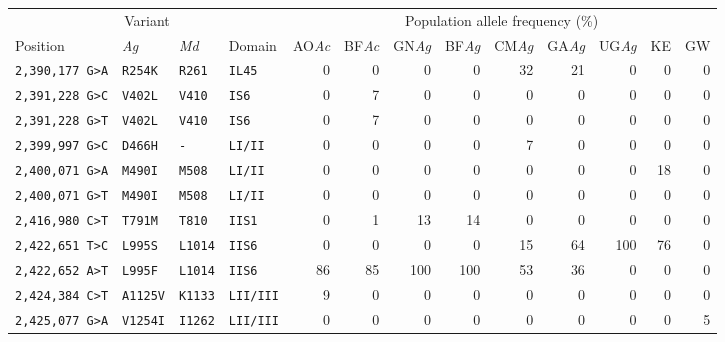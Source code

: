 
\begin{tabular}{llllrrrrrrrrr}
\toprule
\multicolumn{4}{c}{Variant} &
\multicolumn{9}{c}{Population allele frequency (\%)}\\
\cmidrule(r){1-4}
\cmidrule(r){5-13}
Position\tnote{1} & 
\emph{Ag}\tnote{2} & 
\emph{Md}\tnote{3} &
Domain\tnote{4} &
AO\emph{Ac} & 
BF\emph{Ac} & 
GN\emph{Ag} & 
BF\emph{Ag} & 
CM\emph{Ag} & 
GA\emph{Ag} & 
UG\emph{Ag} & 
KE & 
GW\\
\midrule

\texttt{2,390,177 G>A} & \texttt{R254K} & \texttt{R261} & \texttt{IL45} & 0 & 0 & 0 & 0 & 32 & 21 & 0 & 0 & 0 \\

\texttt{2,391,228 G>C} & \texttt{V402L} & \texttt{V410} & \texttt{IS6} & 0 & 7 & 0 & 0 & 0 & 0 & 0 & 0 & 0 \\

\texttt{2,391,228 G>T} & \texttt{V402L} & \texttt{V410} & \texttt{IS6} & 0 & 7 & 0 & 0 & 0 & 0 & 0 & 0 & 0 \\

\texttt{2,399,997 G>C} & \texttt{D466H} & \texttt{-} & \texttt{LI/II} & 0 & 0 & 0 & 0 & 7 & 0 & 0 & 0 & 0 \\

\texttt{2,400,071 G>A} & \texttt{M490I} & \texttt{M508} & \texttt{LI/II} & 0 & 0 & 0 & 0 & 0 & 0 & 0 & 18 & 0 \\

\texttt{2,400,071 G>T} & \texttt{M490I} & \texttt{M508} & \texttt{LI/II} & 0 & 0 & 0 & 0 & 0 & 0 & 0 & 0 & 0 \\

\texttt{2,416,980 C>T} & \texttt{T791M} & \texttt{T810} & \texttt{IIS1} & 0 & 1 & 13 & 14 & 0 & 0 & 0 & 0 & 0 \\

\texttt{2,422,651 T>C} & \texttt{L995S} & \texttt{L1014} & \texttt{IIS6} & 0 & 0 & 0 & 0 & 15 & 64 & 100 & 76 & 0 \\

\texttt{2,422,652 A>T} & \texttt{L995F} & \texttt{L1014} & \texttt{IIS6} & 86 & 85 & 100 & 100 & 53 & 36 & 0 & 0 & 0 \\

\texttt{2,424,384 C>T} & \texttt{A1125V} & \texttt{K1133} & \texttt{LII/III} & 9 & 0 & 0 & 0 & 0 & 0 & 0 & 0 & 0 \\

\texttt{2,425,077 G>A} & \texttt{V1254I} & \texttt{I1262} & \texttt{LII/III} & 0 & 0 & 0 & 0 & 0 & 0 & 0 & 0 & 5 \\


\end{tabular}
